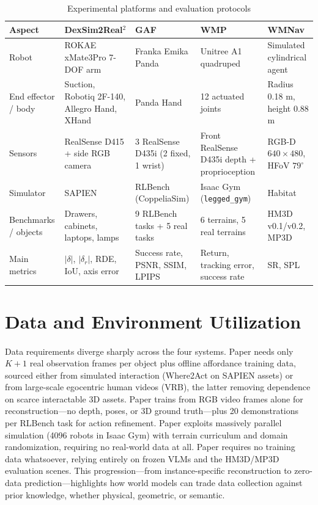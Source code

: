 \documentclass[12pt,a4paper,final]{extreport}
\begin{document}
{\renewcommand{\arraystretch}{1.35}
\begin{table}[htbp]
\centering
\caption{Experimental platforms and evaluation protocols}\label{tab:platforms}
\footnotesize
\begin{tabularx}{\textwidth}{|p{2.35cm}|X|X|X|X|}
\hline
\textbf{Aspect} & \textbf{DexSim2Real$^2$} & \textbf{GAF} & \textbf{WMP} & \textbf{WMNav} \\ \hline
Robot & ROKAE xMate3Pro 7-DOF arm & Franka Emika Panda & Unitree A1 quadruped & Simulated cylindrical agent \\ \hline
End effector / body & Suction, Robotiq 2F-140, Allegro Hand, XHand & Panda Hand & 12 actuated joints & Radius 0.18 m, height 0.88 m \\ \hline
Sensors & RealSense D415 + side RGB camera & 3 RealSense D435i (2 fixed, 1 wrist) & Front RealSense D435i depth + proprioception & RGB-D $640\times480$, HFoV $79^{\circ}$ \\ \hline
Simulator & SAPIEN & RLBench (CoppeliaSim) & Isaac Gym (\texttt{legged\_gym}) & Habitat \\ \hline
Benchmarks / objects & Drawers, cabinets, laptops, lamps & 9 RLBench tasks + 5 real tasks & 6 terrains, 5 real terrains & HM3D v0.1/v0.2, MP3D \\ \hline
Main metrics & $|\delta|$, $|\delta_r|$, RDE, IoU, axis error & Success rate, PSNR, SSIM, LPIPS & Return, tracking error, success rate & SR, SPL \\ \hline
\end{tabularx}
\end{table}}

\section{Data and Environment Utilization}

\paragraph{} Data requirements diverge sharply across the four systems. Paper \cite{p1} needs only $K+1$ real observation frames per object plus offline affordance training data, sourced either from simulated interaction (Where2Act on SAPIEN assets) or from large-scale egocentric human videos (VRB), the latter removing dependence on scarce interactable 3D assets. Paper \cite{p2} trains from RGB video frames alone for reconstruction---no depth, poses, or 3D ground truth---plus 20 demonstrations per RLBench task for action refinement. Paper \cite{p3} exploits massively parallel simulation (4096 robots in Isaac Gym) with terrain curriculum and domain randomization, requiring no real-world data at all. Paper \cite{p4} requires no training data whatsoever, relying entirely on frozen VLMs and the HM3D/MP3D evaluation scenes. This progression---from instance-specific reconstruction to zero-data prediction---highlights how world models can trade data collection against prior knowledge, whether physical, geometric, or semantic.
\end{document}
